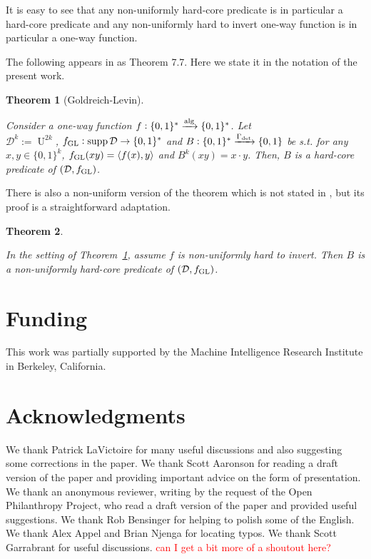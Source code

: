 \documentclass[11pt]{article}
\numberwithin{equation}{section}
\theoremstyle{definition}
\theoremstyle{plain}
\newtheorem{theorem}{Theorem}[section]
\newcommand{\Bool}{\{0,1\}}
\newcommand{\Words}{{\Bool^*}}
\newcommand{\WordsLen}[1]{{\Bool^{#1}}}
\DeclareMathOperator{\Supp}{supp}
\DeclareMathOperator{\Un}{U}
\newcommand{\Chev}[1]{\langle #1 \rangle}
\newcommand{\Dist}{\mathcal{D}}
\newcommand{\Alg}{\xrightarrow{\textnormal{alg}}}
\begin{document}
It is easy to see that any non-uniformly hard-core predicate is in particular a hard-core predicate and any non-uniformly hard to invert one-way function is in particular a one-way function.

The following appears in \cite{Goldreich_2008} as Theorem 7.7. Here we state it in the notation of the present work.

\begin{theorem}[Goldreich-Levin]
\label{thm:goldreich_levin}

Consider a one-way function ${f: \Words \Alg \Words}$. Let\\ $\Dist^k:=\Un^{2k}$, $f_{\textnormal{GL}}: \Supp \Dist \rightarrow \Words$ and ${B: \Words \xrightarrow{\Gamma_{\textnormal{det}}} \Bool}$ be s.t. for any $x,y \in \WordsLen{k}$, $f_{\textnormal{GL}}(xy)=\Chev{f(x),y}$ and ${B^k(xy)=x \cdot y}$. Then, $B$ is a hard-core predicate of $(\Dist, f_{\textnormal{GL}})$.

\end{theorem}

There is also a non-uniform version of the theorem which is not stated in \cite{Goldreich_2008}, but its proof is a straightforward adaptation.

\begin{theorem}
\label{thm:goldreich_levin_circ}

In the setting of Theorem~\ref{thm:goldreich_levin}, assume $f$ is non-uniformly hard to invert. Then $B$ is a non-uniformly hard-core predicate of $(\Dist, f_{\textnormal{GL}})$.
\end{theorem}

\section*{Funding}

This work was partially supported by the Machine Intelligence Research Institute in Berkeley, California.

\section*{Acknowledgments}

We thank Patrick LaVictoire for many useful discussions and also suggesting some corrections in the paper. We thank Scott Aaronson for reading a draft version of the paper and providing important advice on the form of presentation. We thank an anonymous reviewer, writing by the request of the Open Philanthropy Project, who read a draft version of the paper and provided useful suggestions. We thank Rob Bensinger for helping to polish some of the English. We thank Alex Appel and Brian Njenga for locating typos. We thank Scott Garrabrant for useful discussions. \textcolor{red}{can I get a bit more of a shoutout here?}



\end{document}
